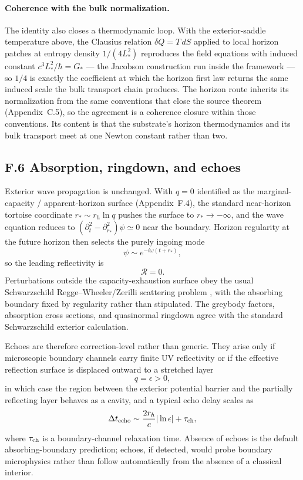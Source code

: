 \documentclass[11pt]{article}
\begin{document}
\paragraph{Coherence with the bulk normalization.}
The identity also closes a thermodynamic loop. With the exterior-saddle temperature above, the Clausius relation $\delta Q=T\,dS$ applied to local horizon patches at entropy density $1/(4L_*^2)$ reproduces the field equations with induced constant $c^3L_*^2/\hbar=G_*$ --- the Jacobson construction \citep{Jacobson1995} run inside the framework --- so $1/4$ is exactly the coefficient at which the horizon first law returns the same induced scale the bulk transport chain produces. The horizon route inherits its normalization from the same conventions that close the source theorem (Appendix~C.5), so the agreement is a coherence closure within those conventions. Its content is that the substrate's horizon thermodynamics and its bulk transport meet at one Newton constant rather than two.

\subsection*{F.6 Absorption, ringdown, and echoes}

Exterior wave propagation is unchanged. With $q=0$ identified as the marginal-capacity / apparent-horizon surface (Appendix~F.4), the standard near-horizon tortoise coordinate $r_*\sim r_h\ln q$ pushes the surface to $r_*\to-\infty$, and the wave equation reduces to $(\partial_t^2-\partial_{r_*}^2)\psi\simeq 0$ near the boundary. Horizon regularity at the future horizon then selects the purely ingoing mode
\[
\psi\sim e^{-i\omega(t+r_*)},
\]
so the leading reflectivity is
\[
\mathcal R=0.
\]
Perturbations outside the capacity-exhaustion surface obey the usual Schwarzschild Regge--Wheeler/Zerilli scattering problem \citep{ReggeWheeler1957,Zerilli1970}, with the absorbing boundary fixed by regularity rather than stipulated. The greybody factors, absorption cross sections, and quasinormal ringdown agree with the standard Schwarzschild exterior calculation.

Echoes are therefore correction-level rather than generic. They arise only if microscopic boundary channels carry finite UV reflectivity or if the effective reflection surface is displaced outward to a stretched layer
\[
q=\epsilon>0,
\]
in which case the region between the exterior potential barrier and the partially reflecting layer behaves as a cavity, and a typical echo delay scales as
\[
\Delta t_{\rm echo}
\sim
\frac{2r_h}{c}|\ln\epsilon|+\tau_{\rm ch},
\]
where $\tau_{\rm ch}$ is a boundary-channel relaxation time. Absence of echoes is the default absorbing-boundary prediction; echoes, if detected, would probe boundary microphysics rather than follow automatically from the absence of a classical interior.
\end{document}

